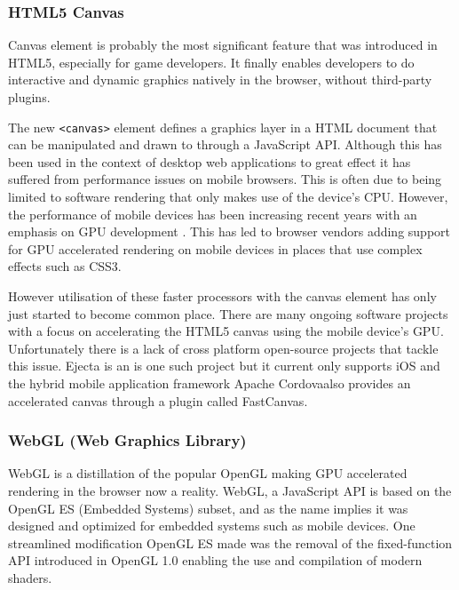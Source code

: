 \documentclass[final]{cmpreport}
\begin{document}
\subsubsection{HTML5 Canvas}
Canvas element is probably the most significant feature that was introduced in HTML5, especially for game developers. It finally enables developers to do interactive and dynamic graphics natively in the browser, without third-party plugins.

The new \texttt{<canvas>} element defines a graphics layer in a HTML document that can be manipulated and drawn to through a JavaScript API. Although this has been used in the context of desktop web applications to great effect it has suffered from performance issues on mobile browsers. This is often due to being limited to software rendering that only makes use of the device's CPU. However, the performance of mobile devices has been increasing recent years with an emphasis on GPU development \cite{Lin}. This has led to browser vendors adding support for GPU accelerated rendering on mobile devices in places that use complex effects such as CSS3.

However utilisation of these faster processors with the canvas element has only just started to become common place. There are many ongoing software projects with a focus on accelerating the HTML5 canvas using the mobile device's GPU. Unfortunately there is a lack of cross platform open-source projects that tackle this issue. Ejecta is an is one such project but it current only supports iOS and the hybrid mobile application framework Apache Cordova\footnotemark also provides an accelerated canvas through a plugin called FastCanvas\footnotemark.


\subsubsection{WebGL (Web Graphics Library)}
WebGL is a distillation of the popular OpenGL making GPU accelerated rendering in the browser now a reality. WebGL, a JavaScript API is based on the OpenGL ES (Embedded Systems) subset, and as the name implies it was designed and optimized for embedded systems such as mobile devices. One streamlined modification OpenGL ES made was the removal of the fixed-function API introduced in OpenGL 1.0 enabling the use and compilation of modern shaders.
\end{document}

